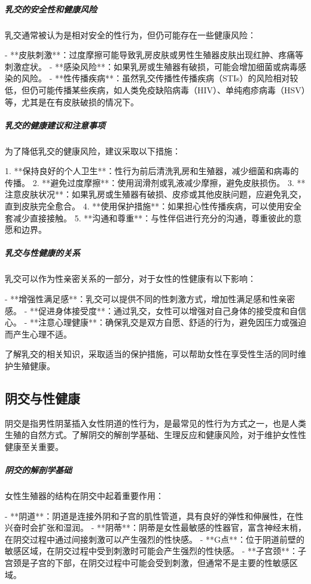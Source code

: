 \begin{enumerate}
\subparagraph{乳交的安全性和健康风险}

乳交通常被认为是相对安全的性行为，但仍可能存在一些健康风险：

- **皮肤刺激**：过度摩擦可能导致乳房皮肤或男性生殖器皮肤出现红肿、疼痛等刺激症状。
- **感染风险**：如果乳房或生殖器有破损，可能会增加细菌或病毒感染的风险。
- **性传播疾病**：虽然乳交传播性传播疾病（STIs）的风险相对较低，但仍可能传播某些疾病，如人类免疫缺陷病毒（HIV）、单纯疱疹病毒（HSV）等，尤其是在有皮肤破损的情况下。

\subparagraph{乳交的健康建议和注意事项}

为了降低乳交的健康风险，建议采取以下措施：

1. **保持良好的个人卫生**：性行为前后清洗乳房和生殖器，减少细菌和病毒的传播。
2. **避免过度摩擦**：使用润滑剂或乳液减少摩擦，避免皮肤损伤。
3. **注意皮肤状况**：如果乳房或生殖器有破损、皮疹或其他皮肤问题，应避免乳交，直到皮肤完全愈合。
4. **使用保护措施**：如果担心性传播疾病，可以使用安全套减少直接接触。
5. **沟通和尊重**：与性伴侣进行充分的沟通，尊重彼此的意愿和边界。

\subparagraph{乳交与性健康的关系}

乳交可以作为性亲密关系的一部分，对于女性的性健康有以下影响：

- **增强性满足感**：乳交可以提供不同的性刺激方式，增加性满足感和性亲密感。
- **促进身体接受度**：通过乳交，女性可以增强对自己身体的接受度和自信心。
- **注意心理健康**：确保乳交是双方自愿、舒适的行为，避免因压力或强迫而产生心理不适。

了解乳交的相关知识，采取适当的保护措施，可以帮助女性在享受性生活的同时维护生殖健康。

\subsection{阴交与性健康}

阴交是指男性阴茎插入女性阴道的性行为，是最常见的性行为方式之一，也是人类生殖的自然方式。了解阴交的解剖学基础、生理反应和健康风险，对于维护女性性健康至关重要。

\subparagraph{阴交的解剖学基础}

女性生殖器的结构在阴交中起着重要作用：

- **阴道**：阴道是连接外阴和子宫的肌性管道，具有良好的弹性和伸展性，在性兴奋时会扩张和湿润。
- **阴蒂**：阴蒂是女性最敏感的性器官，富含神经末梢，在阴交过程中通过间接刺激可以产生强烈的性快感。
- **G点**：位于阴道前壁的敏感区域，在阴交过程中受到刺激时可能会产生强烈的性快感。
- **子宫颈**：子宫颈是子宫的下部，在阴交过程中可能会受到刺激，但通常不是主要的性敏感区域。


\end{enumerate}
